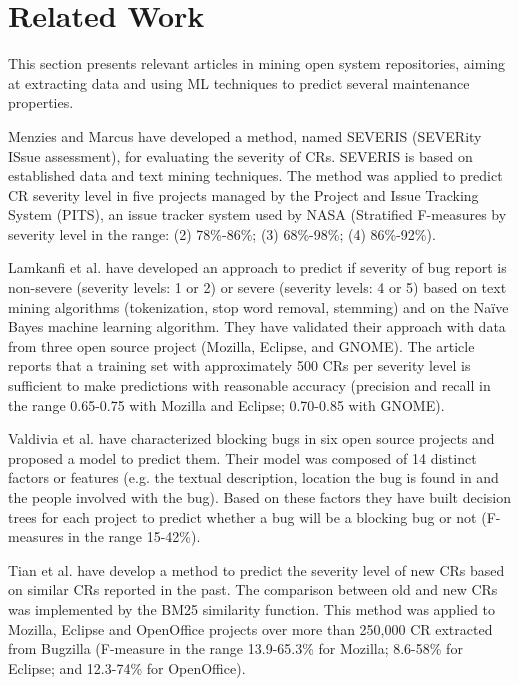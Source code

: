 \section{Related Work}\label{sec:relatedwork} 

This section presents relevant articles in mining open system repositories, aiming at extracting data and using ML techniques to predict several maintenance properties. 

Menzies and Marcus\cite{Menzies2008} have developed a method, named SEVERIS (SEVERity ISsue assessment), for evaluating the severity of CRs. SEVERIS is based on established data and text mining techniques. The method was applied to predict CR severity level in five projects managed by the Project and Issue Tracking System (PITS), an issue tracker system used by NASA (Stratified F-measures by severity level in the range: (2) 78\%-86\%; (3) 68\%-98\%; (4) 86\%-92\%).


Lamkanfi et al.\cite{Lamkanfi2010} have developed an approach to predict if severity of bug report is non-severe (severity levels: 1 or 2) or severe (severity levels: 4 or 5) based on text mining algorithms (tokenization, stop word removal, stemming) and on the Naïve Bayes machine learning algorithm. They have validated their approach with data from three open source project (Mozilla, Eclipse, and GNOME). The article reports that a training set with approximately 500 CRs per severity level is sufficient to make predictions with reasonable accuracy (precision and recall in the range 0.65-0.75 with Mozilla and Eclipse; 0.70-0.85 with GNOME).

Valdivia et al.\cite{ValdiviaGarcia2014} have characterized blocking bugs in six open source projects and proposed a model to predict them. Their model was composed of 14 distinct factors or features (e.g. the textual description, location the bug is found in and the people involved with the bug). Based on these factors they have built decision trees for each project to predict whether a bug will be a blocking bug or not (F-measures in the range 15-42\%).

Tian et al.\cite{Tian2012} have develop a method to predict the severity level of new CRs based on similar CRs reported in the past. The comparison between old and new CRs was implemented by the BM25 similarity function. This method was applied to Mozilla, Eclipse and OpenOffice projects over more than 250,000 CR extracted from Bugzilla (F-measure in the range 13.9-65.3\% for Mozilla; 8.6-58\% for Eclipse; and 12.3-74\% for OpenOffice). 


